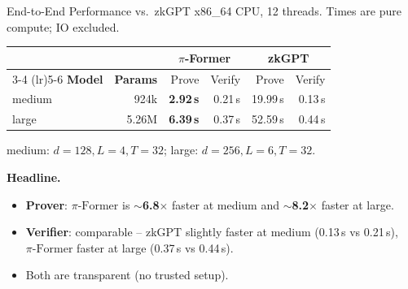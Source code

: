 \documentclass[10pt]{beamer}
\newcommand{\sys}{\ensuremath{\pi\text{-Former}}}
\begin{document}
\begin{frame}{End-to-End Performance vs.\ zkGPT}
x86\_64 CPU, 12 threads. Times are pure compute; IO excluded.

\medskip
\begin{center}
\scriptsize
\setlength{\tabcolsep}{4pt}
\begin{tabular}{lrrrrr}
\toprule
& & \multicolumn{2}{c}{\textbf{$\pi$-Former}} & \multicolumn{2}{c}{\textbf{zkGPT}} \\
\cmidrule(lr){3-4} \cmidrule(lr){5-6}
\textbf{Model} & \textbf{Params} & Prove & Verify & Prove & Verify \\
\midrule
medium  & 924k  & \textbf{2.92\,s} & 0.21\,s          & 19.99\,s  & 0.13\,s   \\
large   & 5.26M & \textbf{6.39\,s} & 0.37\,s          & 52.59\,s  & 0.44\,s   \\
\bottomrule
\end{tabular}
\end{center}

\smallskip
{\scriptsize medium: $d{=}128,L{=}4,T{=}32$;\;\;
large: $d{=}256,L{=}6,T{=}32$.}

\medskip
\textbf{Headline.}
\begin{itemize}
  \item \textbf{Prover}: \sys{} is $\sim$\textbf{6.8$\times$} faster at
        medium and $\sim$\textbf{8.2$\times$} faster at large.
  \item \textbf{Verifier}: comparable -- zkGPT slightly faster at
        medium (0.13\,s vs 0.21\,s), \sys{} faster at large
        (0.37\,s vs 0.44\,s).
  \item Both are transparent (no trusted setup).
\end{itemize}
\end{frame}
\end{document}
